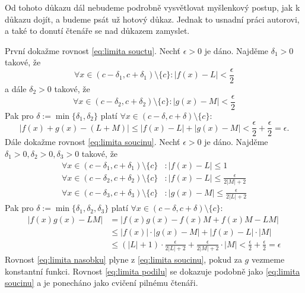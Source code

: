 \begin{důkaz}
	Od tohoto důkazu dál nebudeme podrobně vysvětlovat myšlenkový postup, jak k důkazu dojít, a budeme psát už hotový důkaz. Jednak to usnadní práci autorovi, a také to donutí čtenáře se nad důkazem zamyslet.

	První dokažme rovnost \ref{eq:limita souctu}. Nechť $\epsilon>0$ je dáno. Najděme $\delta_1>0$ takové, že
	\begin{equation*}
		\forall x\in (c-\delta_1,c+\delta_1)\setminus \{c\}\colon |f(x)-L|<\frac{\epsilon}{2}
	\end{equation*}
	a dále $\delta_2>0$ takové, že
	\begin{equation*}
		\forall x\in (c-\delta_2,c+\delta_2)\setminus \{c\}\colon |g(x)-M|<\frac{\epsilon}{2}
	\end{equation*}
	Pak pro $\delta:=\min\{\delta_1,\delta_2\}$ platí $\forall x\in (c-\delta,c+\delta)\setminus \{c\}\colon $
	\begin{equation*}
		|f(x)+g(x)-(L+M)|\leq |f(x)-L|+|g(x)-M|< \frac{\epsilon}{2}+\frac{\epsilon}{2}=\epsilon.
	\end{equation*}
	Dále dokažme rovnost \ref{eq:limita soucinu}.
	Nechť $\epsilon>0$ je dáno. Najděme $\delta_1>0, \delta_2>0, \delta_3>0$ takové, že 
	\begin{align*}
		\forall x\in(c-\delta_1,c+\delta_1)\setminus \{c\} &\colon |f(x)-L|\leq 1  \\
		\forall x\in(c-\delta_2,c+\delta_2)\setminus \{c\} &\colon |f(x)-L|\leq \frac{\epsilon}{2|M|+2}  \\
		\forall x\in(c-\delta_3,c+\delta_3)\setminus \{c\} &\colon |g(x)-M|\leq \frac{\epsilon}{2|L|+2}
	\end{align*}
	Pak pro $\delta:=\min\{\delta_1,\delta_2,\delta_3\}$ platí $\forall x\in (c-\delta,c+\delta)\setminus\{c\}\colon $
	\begin{align*}
		|f(x)g(x)-LM|&=|f(x)g(x)-f(x)M+f(x)M-LM| \\
	  &\leq |f(x)|\cdot|g(x)-M|+|f(x)-L|\cdot |M| \\
	  &\leq (|L|+1)\cdot \frac{\epsilon}{2|L|+2} + \frac{\epsilon}{2|M|+2}\cdot |M| < \frac{\epsilon}{2}+\frac{\epsilon}{2}=\epsilon
	\end{align*}
	Rovnost \ref{eq:limita nasobku} plyne z \ref{eq:limita soucinu}, pokud za $g$ vezmeme konstantní funkci. Rovnost \ref{eq:limita podilu} se dokazuje podobně jako \ref{eq:limita soucinu} a je ponecháno jako cvičení pilnému čtenáři.
\end{důkaz}

